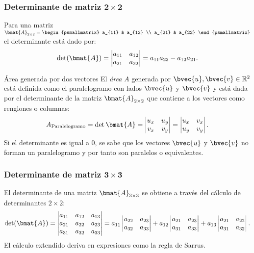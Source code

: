 \documentclass{fmbnotes}
\begin{document}
\subsubsection[Determinante de matriz \(2 \times 2\)]{Determinante de matriz \(\bm{2 \times 2}\)}

Para una matriz \(\bmat{A}_{2 \times 2}=\begin{psmallmatrix}
a_{11} & a_{12} \\ a_{21} & a_{22}
\end{psmallmatrix}\) el determinante está dado por:
\[\det(\bmat{A})=\begin{vmatrix}
a_{11} & a_{12} \\ a_{21} & a_{22}
\end{vmatrix}=a_{11}a_{22}-a_{12}a_{21}.\]

\begin{definicion}{Área generada por dos vectores}{}
El \emph{área} \(A\) generada por \(\bvec{u},\bvec{v} \in \mathbb{R}^{2}\) está definida como el paralelogramo con lados \( \bvec{u} \) y \( \bvec{v} \) y está dada por el determinante de la matriz \(\bmat{A}_{2 \times 2}\) que contiene a los vectores como renglones o columnas:
\[A_{\text{Paralelogramo}}=\det \bmat{A}=\begin{vmatrix}
u_x & u_y\\ v_x & v_y
\end{vmatrix}=\begin{vmatrix}
u_x & v_x \\ u_y & v_y
\end{vmatrix}.\]
Si el determinante es igual a 0, se sabe que los vectores \( \bvec{u} \) y \( \bvec{v} \) no forman un paralelogramo y por tanto son paralelos o equivalentes.
\end{definicion}

\subsubsection[Determinante de matriz \( 3 \times 3 \)]{Determinante de matriz \( \bm{3 \times 3 }\)}
El determinante de una matriz \(\bmat{A}_{3 \times 3}\) se obtiene a través del cálculo de determinantes \(2 \times 2\):
\[\det(\bmat{A})=\begin{vmatrix}
a_{11} & a_{12} & a_{13} \\ a_{21} & a_{22} & a_{23} \\ a_{31} & a_{32} & a_{33}
\end{vmatrix}=a_{11}\begin{vmatrix}
a_{22} & a_{23} \\ a_{32} & a_{33}
\end{vmatrix}+a_{12}\begin{vmatrix}
a_{21} & a_{23} \\ a_{31} & a_{33}
\end{vmatrix}+a_{13}\begin{vmatrix}
a_{21} & a_{22} \\ a_{31} & a_{32}
\end{vmatrix}.\]
El cálculo extendido deriva en expresiones como la regla de Sarrus.
\end{document}
